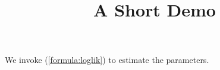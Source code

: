 \documentclass[article]{jss}
\title{A Short Demo}
\begin{document}
We invoke (\ref{formula:loglik}) to estimate the parameters.
\end{document}
